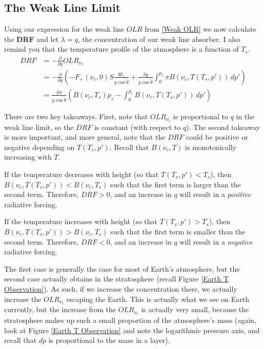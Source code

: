 \subsection{The Weak Line Limit}

Using our expression for the weak line $OLR$ from \ref{Weak OLR} we now calculate the \textbf{DRF} and let $\lambda=q$, the concentration of our weak line absorber. I also remind you that the temperature profile of the atmosphere is a function of $T_s$.
\begin{align}
    DRF &= -\frac{\partial}{\partial q}OLR_{\nu_c}\nonumber\\
    &=-\frac{\partial}{\partial q} \left( 
        -F_+(\nu_c,0)S\frac{qp_s}{g\cos\tilde{\theta}}+\frac{Sq}{g\cos\tilde{\theta}}\int_{0}^{p_s}\pi B(\nu_c,T(T_s,p'))\,dp'
     \right)\nonumber\\
    \label{DRF Weak Explicit}
    &=
    \frac{S\pi}{g\cos\tilde{\theta}}\left( 
        B(\nu_c,T_s)p_s - \int_{0}^{p_s} B(\nu_c,T(T_s,p'))\,dp'
     \right)
\end{align}

There are two key takeaways. First, note that $OLR_{\nu_c}$ is proportional to $q$ in the weak line limit, so the $DRF$ is constant (with respect to $q$). The second takeaway is more important, and more general, note that the $DRF$ could be positive or negative depending on $T(T_s,p')$. Recall that $B(\nu_c,T)$ is monotonically increasing with $T$. 

If the temperature decreases with height (so that $T(T_s,p')<T_s$), then $B(\nu_c,T(T_s,p'))<B(\nu_c,T_s)$ such that the first term is larger than the second term. Therefore, $DRF>0$, and an increase in $q$ will result in a \textit{positive} radiative forcing.

If the temperature increases with height (so that $T(T_s,p')>T_s$), then $B(\nu_c,T(T_s,p'))>B(\nu_c,T_s)$ such that the first term is smaller than the second term. Therefore, $DRF<0$, and an increase in $q$ will result in a \textit{negative} radiative forcing.

The first case is generally the case for most of Earth's atmosphere, but the second case actually obtains in the stratosphere (recall Figure \ref{Earth T Observation}). As such, if we increase the concentration there, we actually increase the $OLR_{\nu_c}$ escaping the Earth. This is actually what we see on Earth currently, but the increase from the $OLR_{\nu_c}$ is actually very small, because the stratosphere makes up such a small proportion of the atmosphere's mass (again, look at Figure \ref{Earth T Observation} and note the logarithmic pressure axis, and recall that $dp$ is proportional to the mass in a layer).

